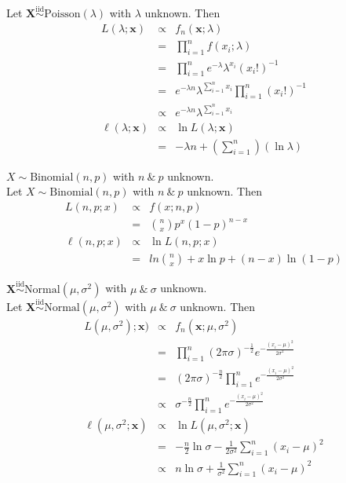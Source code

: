 \documentclass[11pt,a4paper]{article}
\begin{document}
\apart
Let $\textbf{X}\overset{\mathrm{iid}}{\sim}\mathrm{Poisson}(\lambda)$ with $\lambda$ unknown. Then
\[\begin{array}{rcl}
L(\lambda;\textbf{x})&\propto&f_n(\textbf{x};\lambda)\\
&=&\prod\limits_{i=1}^nf(x_i;\lambda)\\
&=&\prod\limits_{i=1}^ne^{-\lambda}\lambda^{x_i}(x_i!)^{-1}\\
&=& e^{-\lambda n}\lambda^{\sum_{i=1}^n x_i}\prod\limits_{i=1}^n(x_i!)^{-1}\\
&\propto&e^{-\lambda n}\lambda^{\sum_{i=1}^n x_i}\\
\ell(\lambda;\textbf{x})&\propto&\ln L(\lambda;\textbf{x})\\
&=&-\lambda n+\left(\sum\limits_{i=1}^n\right)(\ln\lambda)
\end{array}\]

\qpartnb $X\sim\mathrm{Binomial}(n,p)$ with $n\ \&\ p$ unknown.\\

\apart
Let $X\sim\mathrm{Binomial}(n,p)$ with $n\ \&\ p$ unknown. Then
\[\begin{array}{rcl}
L(n,p;x)&\propto&f(x;n,p)\\
&=&{n \choose x}p^x(1-p)^{n-x}\\
\ell(n,p;x)&\propto&\ln L(n,p;x)\\
&=&ln{n \choose x} + x\ln p + (n-x)\ln(1-p)
\end{array}\]

\qpartnb $\textbf{X}\overset{\mathrm{iid}}{\sim}\mathrm{Normal}(\mu,\sigma^2)$ with $\mu\ \&\ \sigma$ unknown.\\

\apart
Let $\textbf{X}\overset{\mathrm{iid}}{\sim}\mathrm{Normal}(\mu,\sigma^2)$ with $\mu\ \&\ \sigma$ unknown. Then
\[\begin{array}{rcl}
L(\mu,\sigma^2);\textbf{x})&\propto&f_n(\textbf{x};\mu,\sigma^2)\\
&=&\prod\limits_{i=1}^n (2\pi\sigma)^{-\frac{1}{2}} e^{-\frac{(x_i-\mu)^2}{2\sigma^2}}\\
&=&(2\pi\sigma)^{-\frac{n}{2}}\prod\limits_{i=1}^n e^{-\frac{(x_i-\mu)^2}{2\sigma^2}}\\
&\propto&\sigma^{-\frac{n}{2}}\prod\limits_{i=1}^n e^{-\frac{(x_i-\mu)^2}{2\sigma^2}}\\
\ell(\mu,\sigma^2;\textbf{x})&\propto&\ln L(\mu,\sigma^2;\textbf{x})\\
&=&-\frac{n}{2}\ln\sigma -\frac{1}{2\sigma^2}\sum\limits_{i=1}^n(x_i-\mu)^2\\
&\propto&n\ln\sigma +\frac{1}{\sigma^2}\sum\limits_{i=1}^n(x_i-\mu)^2
\end{array}\]
\end{document}
